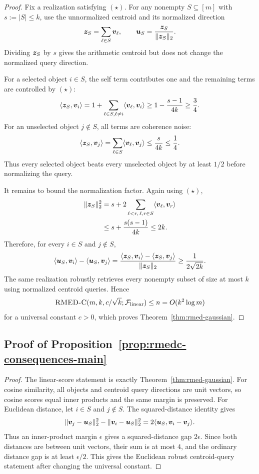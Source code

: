 \documentclass{article}
\begin{document}
\begin{proof}
Fix a realization satisfying $(\star)$. For any nonempty
$S\subseteq[m]$ with $s:=|S|\le k$, use the unnormalized centroid and
its normalized direction
\[
    \bm{z}_S=\sum_{\ell\in S}\bm{v}_\ell,
    \qquad
    \bm{u}_S=\frac{\bm{z}_S}{\|\bm{z}_S\|_2}.
\]
Dividing $\bm{z}_S$ by $s$ gives the arithmetic centroid but does not
change the normalized query direction.

For a selected object $i\in S$, the self term contributes one and the
remaining terms are controlled by $(\star)$:
\[
    \langle \bm{z}_S,\bm{v}_i\rangle
    =1+\sum_{\ell\in S,\ell\ne i}\langle \bm{v}_\ell,\bm{v}_i\rangle
    \ge
    1-\frac{s-1}{4k}
    \ge
    \frac{3}{4}.
\]
For an unselected object $j\notin S$, all terms are coherence noise:
\[
    \langle \bm{z}_S,\bm{v}_j\rangle
    =\sum_{\ell\in S}\langle \bm{v}_\ell,\bm{v}_j\rangle
    \le
    \frac{s}{4k}
    \le
    \frac{1}{4}.
\]
Thus every selected object beats every unselected object by at least
$1/2$ before normalizing the query.

It remains to bound the normalization factor. Again using $(\star)$,
\[
\begin{aligned}
    \|\bm{z}_S\|_2^2
    &=
    s+2\sum_{\ell<r,\,\ell,r\in S}
      \langle \bm{v}_\ell,\bm{v}_r\rangle \\
    &\le
    s+\frac{s(s-1)}{4k}
    \le
    2k.
\end{aligned}
\]
Therefore, for every $i\in S$ and $j\notin S$,
\[
    \langle \bm{u}_S,\bm{v}_i\rangle-
    \langle \bm{u}_S,\bm{v}_j\rangle
    =
    \frac{\langle \bm{z}_S,\bm{v}_i\rangle-
          \langle \bm{z}_S,\bm{v}_j\rangle}{\|\bm{z}_S\|_2}
    \ge
    \frac{1}{2\sqrt{2k}}.
\]
The same realization robustly retrieves every nonempty subset of size at
most $k$ using normalized centroid queries. Hence
\[
    \textsc{RMED-C}(m,k,c/\sqrt{k};\mathcal{F}_{\rm linear})
    \le
    n
    =O(k^2\log m)
\]
for a universal constant $c>0$, which proves
Theorem~\ref{thm:rmed-gaussian}.
\end{proof}

\subsection{Proof of Proposition~\ref{prop:rmedc-consequences-main}}\label{app:proof:prop:rmedc-consequences-main}

\begin{proof}
The linear-score statement is exactly Theorem~\ref{thm:rmed-gaussian}.
For cosine similarity, all objects and centroid query directions are
unit vectors, so cosine scores equal inner products and the same margin
is preserved. For Euclidean distance, let $i\in S$ and $j\notin S$.
The squared-distance identity gives
\[
    \|\bm{v}_j-\bm{u}_S\|_2^2-\|\bm{v}_i-\bm{u}_S\|_2^2
    =
    2\langle \bm{u}_S,\bm{v}_i-\bm{v}_j\rangle.
\]
Thus an inner-product margin $\epsilon$ gives a squared-distance gap
$2\epsilon$. Since both distances are between unit vectors, their sum is
at most $4$, and the ordinary distance gap is at least $\epsilon/2$.
This gives the Euclidean robust centroid-query statement after changing
the universal constant.
\end{proof}
\end{document}
